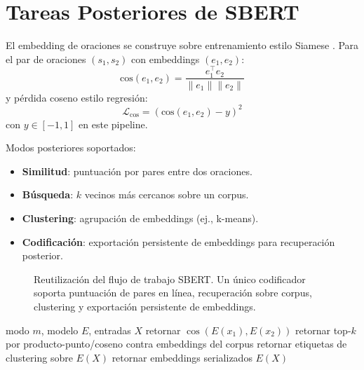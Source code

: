 \section{Tareas Posteriores de SBERT}
\label{sec:sbert}

El embedding de oraciones se construye sobre entrenamiento estilo Siamese \citep{reimers_sentence-bert_2019}. Para el par de oraciones $(s_1,s_2)$ con embeddings $(e_1,e_2)$:
\[
\text{cos}(e_1,e_2)=\frac{e_1^\top e_2}{\|e_1\|\|e_2\|}
\]
y pérdida coseno estilo regresión:
\[
\mathcal{L}_{\text{cos}}=\left(\text{cos}(e_1,e_2)-y\right)^2
\]
con $y\in[-1,1]$ en este pipeline.

Modos posteriores soportados:
\begin{itemize}[leftmargin=*]
    \item \textbf{Similitud}: puntuación por pares entre dos oraciones.
    \item \textbf{Búsqueda}: $k$ vecinos más cercanos sobre un corpus.
    \item \textbf{Clustering}: agrupación de embeddings (ej., k-means).
    \item \textbf{Codificación}: exportación persistente de embeddings para recuperación posterior.
\end{itemize}

\begin{figure}[t]
\centering
{}
\caption{Reutilización del flujo de trabajo SBERT. Un único codificador soporta puntuación de pares en línea, recuperación sobre corpus, clustering y exportación persistente de embeddings.}
\label{fig:sbert-modes}
\end{figure}

\begin{algorithm}[t]
\caption{Enrutador de Modo de Inferencia SBERT}
\begin{algorithmic}[1]
\Require modo $m$, modelo $E$, entradas $X$
    \State retornar $\cos(E(x_1),E(x_2))$
    \State retornar top-$k$ por producto-punto/coseno contra embeddings del corpus
    \State retornar etiquetas de clustering sobre $E(X)$
\Else
    \State retornar embeddings serializados $E(X)$
\EndIf
\end{algorithmic}
\end{algorithm}

